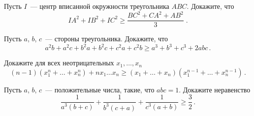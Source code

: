 \begin{problems}
\item
Пусть $I$~— центр вписанной окружности треугольника $ABC$.
Докажите, что
\[
    IA^2 + IB^2 + IC^2
\geq
    \frac{BC^2 + CA^2 + AB^2}{3}
\; . \]

\item
Пусть $a$, $b$, $c$~— стороны треугольника.
Докажите, что
\[
    a^2 b + a^2 c + b^2 a + b^2 c + c^2 a + c^2 b
\geq
    a^3 + b^3 + c^3 + 2 a b c
\, . \]

\item
Докажите для всех неотрицательных $x_1, \ldots, x_n$
\[
    (n - 1) (x_1^n + \ldots + x_n^n) + n x_1 \ldots x_n
\geq
    (x_1 + \ldots + x_n) (x_1^{n-1} + \ldots + x_n^{n-1})
\, . \]

\item
Пусть $a$, $b$, $c$~— положительные числа, такие, что $a b c = 1$.
Докажите неравенство
\[
    \frac{1}{a^3 (b + c)} +
    \frac{1}{b^3 (c + a)} +
    \frac{1}{c^3 (a + b)}
\geq
    \frac{3}{2}
\, . \]

\end{problems}

